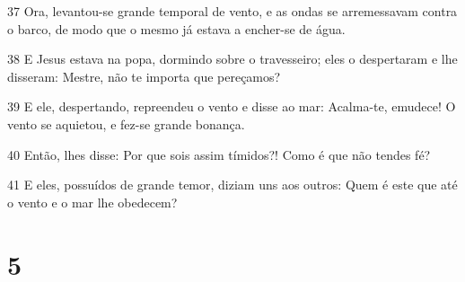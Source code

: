 \par 37 Ora, levantou-se grande temporal de vento, e as ondas se arremessavam contra o barco, de modo que o mesmo já estava a encher-se de água.
\par 38 E Jesus estava na popa, dormindo sobre o travesseiro; eles o despertaram e lhe disseram: Mestre, não te importa que pereçamos?
\par 39 E ele, despertando, repreendeu o vento e disse ao mar: Acalma-te, emudece! O vento se aquietou, e fez-se grande bonança.
\par 40 Então, lhes disse: Por que sois assim tímidos?! Como é que não tendes fé?
\par 41 E eles, possuídos de grande temor, diziam uns aos outros: Quem é este que até o vento e o mar lhe obedecem?

\chapter{5}

